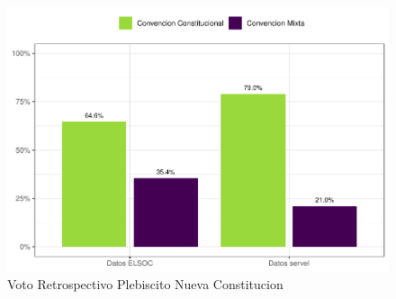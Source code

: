 \documentclass[
  12pt,
]{book}
\begin{document}
\begin{figure}

{\centering \includegraphics{reporte-elsoc_files/figure-latex/servel-cc-1} 

}

\caption{Voto Retrospectivo Plebiscito Nueva Constitucion}\label{fig:servel-cc}
\end{figure}
\end{document}
